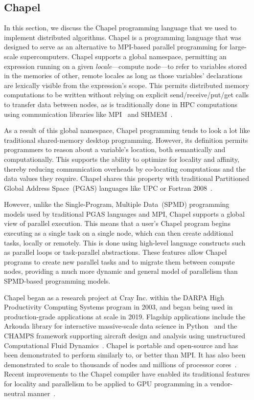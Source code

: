 \subsection{Chapel}

In this section, we discuss the Chapel programming language that we used to implement distributed algorithms. Chapel is a programming language that was designed to serve as an alternative to MPI-based parallel programming for large-scale supercomputers. Chapel supports a global namespace, permitting an expression running on a given \emph{locale}---compute node---to refer to variables stored in the memories of other, remote locales as long as those variables' declarations are lexically visible from the expression's scope. This permits distributed memory computations to be written without relying on explicit send/receive/put/get calls to transfer data between nodes, as is traditionally done in HPC computations using communication libraries like MPI~\cite{Forum2021mpi} and SHMEM~\cite{Chapman2010intro}.

As a result of this global namespace, Chapel programming tends to look a lot like traditional shared-memory desktop programming. However, its definition permits programmers to reason about a variable's location, both semantically and computationally. This supports the ability to optimize for locality and affinity, thereby reducing communication overheads by co-locating computations and the data values they require. Chapel shares this property with traditional Partitioned Global Address Space~(PGAS) languages like UPC or Fortran 2008~\cite{ElGhazawi2005upc,Fortran2008}.

However, unlike the Single-Program, Multiple Data~(SPMD) programming models used by traditional PGAS languages and MPI, Chapel supports a global view of parallel execution. This means that a user's Chapel program begins executing as a single task on a single node, which can then create additional tasks, locally or remotely. This is done using high-level language constructs such as parallel loops or task-parallel abstractions. These features allow Chapel programs to create new parallel tasks and to migrate them between compute nodes, providing a much more dynamic and general model of parallelism than SPMD-based programming models.

Chapel began as a research project at Cray Inc. within the DARPA High Productivity Computing Systems program in 2003, and began being used in production-grade applications at scale in 2019. Flagship applications include the Arkouda library for interactive massive-scale data science in Python~\cite{Merrill2019arkou} and the CHAMPS framework supporting aircraft design and analysis using unstructured Computational Fluid Dynamics~\cite{Parent2021DevelopmentOf}. Chapel is portable and open-source and has been demonstrated to perform similarly to, or better than MPI. It has also been demonstrated to scale to thousands of nodes and millions of processor cores~\cite{Chambe2023PracticalExamp}. Recent improvements to the Chapel compiler have enabled its traditional features for locality and parallelism to be applied to GPU programming in a vendor-neutral manner~\cite{Kayrak2023RecentGpuProg}.

